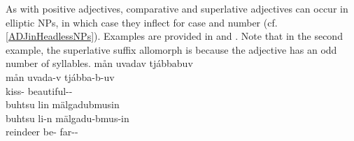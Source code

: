 As with positive adjectives, comparative and superlative adjectives can occur in elliptic NPs, in which case they inflect for case and number (cf. \SEC\ref{ADJinHeadlessNPs}). Examples are provided in  and . Note that in the second example, the superlative suffix allomorph is  because the adjective has an odd number of syllables.
\ea\label{compATTRADJex2}%
\glll	mån uvadav tjábbabuv\\
	mån uvada-v tjábba-b-uv\\
	 kiss- beautiful--\\\nopagebreak
{}	
\z
\ea\label{superlATTRADJex2}
\glll	buhtsu lin mälgadubmusin\\
	buhtsu li-n mälgadu-bmus-in\\
	reindeer\BS{} be- far--\\\nopagebreak
{}	%
\z


